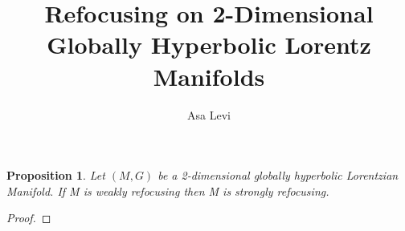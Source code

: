 \documentclass{article}
\title{Refocusing on 2-Dimensional Globally Hyperbolic Lorentz Manifolds}
\author{Asa Levi}
\newtheorem{proposition}{Proposition}
\begin{document}
\maketitle
\begin{proposition}
Let $(M, G)$ be a 2-dimensional globally hyperbolic Lorentzian Manifold.  If M is weakly refocusing then M is  strongly refocusing.
\end{proposition}
\begin{proof}

\end{proof}
\end{document}
